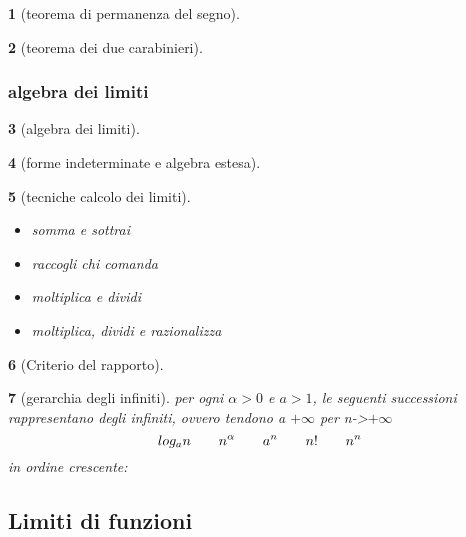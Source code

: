 \documentclass{article}
\theoremstyle{mystyle}
\newtheorem*{mydefinition}{}
\begin{document}
\begin{mydefinition}[teorema di permanenza del segno]
    
\end{mydefinition}
\begin{mydefinition}[teorema dei due carabinieri]
    
\end{mydefinition}
\subsubsection{algebra dei limiti}
\begin{mydefinition}[algebra dei limiti]
    
\end{mydefinition}
\begin{mydefinition}[forme indeterminate e algebra estesa]
    
\end{mydefinition}
\begin{mydefinition}[tecniche calcolo dei limiti]
\begin{itemize}
a seguito una lista delle piu' basilari tecniche di risoluzione dei limiti
    \item somma e sottrai
    \item raccogli chi comanda
    \item moltiplica e dividi
    \item moltiplica, dividi e razionalizza
\end{itemize}

\end{mydefinition}

\begin{mydefinition}[Criterio del rapporto]
    
\end{mydefinition}
\begin{mydefinition}[gerarchia degli infiniti]
per ogni $\alpha > 0$  e  $a>1$, le seguenti successioni rappresentano degli \emph{infiniti}, ovvero tendono a $+ \infty$ per n->$+\infty$
    $$log_an\hspace{7mm}n^\alpha\hspace{7mm}a^n\hspace{7mm}n!\hspace{7mm}n^n$$
    in ordine crescente:
\end{mydefinition}
\subsection{Limiti di funzioni}
\end{document}
